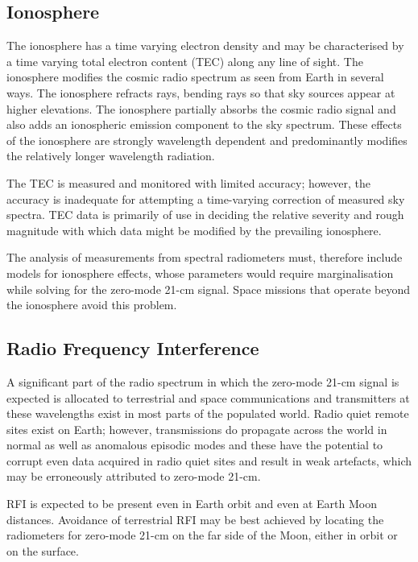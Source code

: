 \subsection{Ionosphere}

The ionosphere has a time varying electron density and may be characterised by a time varying total electron content (TEC) along any line of sight.  The ionosphere modifies the cosmic radio spectrum as seen from Earth in several ways. The ionosphere refracts rays, bending rays so that sky sources appear at higher elevations.  The ionosphere partially absorbs the cosmic radio signal and also adds an ionospheric emission component to the sky spectrum. These effects of the ionosphere are strongly wavelength dependent and predominantly modifies the relatively longer wavelength radiation.  

The TEC is measured and monitored with limited accuracy; however, the accuracy is inadequate for attempting a time-varying correction of measured sky spectra.  TEC data is primarily of use in deciding the relative severity and rough magnitude with which data might be modified by the prevailing ionosphere.  

The analysis of measurements from spectral radiometers must, therefore include models for ionosphere effects, whose parameters would require marginalisation while solving for the zero-mode 21-cm signal.  Space missions that operate beyond the ionosphere avoid this problem.

\subsection{Radio Frequency Interference}

A significant part of the radio spectrum in which the zero-mode 21-cm signal is expected is allocated to terrestrial and space communications and transmitters at these wavelengths exist in most parts of the populated world.  Radio quiet remote sites exist on Earth; however, transmissions do propagate across the world in normal as well as anomalous episodic modes and these have the potential to corrupt even data acquired in radio quiet sites and result in weak artefacts, which may be erroneously attributed to zero-mode 21-cm.  

RFI is expected to be present even in Earth orbit and even at Earth Moon distances.  Avoidance of terrestrial RFI may be best achieved by locating the radiometers for zero-mode 21-cm on the far side of the Moon, either in orbit or on the surface.

